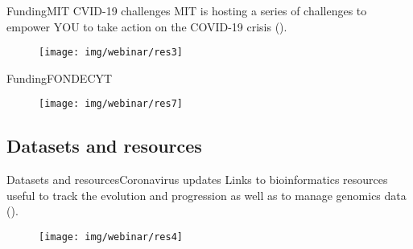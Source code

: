 \documentclass[10pt]{beamer}
\newcommand{\1}{
        	\setbeamertemplate{background}{
        		\texttt{[image: img/1]}
        		\tikz[overlay] \fill[fill opacity=0.75,fill=white] (0,0) rectangle (-\paperwidth,\paperheight);
        	}
}
\begin{document}
\begin{frame}{Funding}{MIT CVID-19 challenges }
	MIT is hosting a series of challenges to empower YOU to take action on the COVID-19 crisis (\href{https://covid19challenge.mit.edu/}{}).
	\begin{figure}[]
		\centering
		\texttt{[image: img/webinar/res3]}				
	\end{figure}	
\end{frame}

\begin{frame}{Funding}{FONDECYT}	
	\begin{figure}[]
		\centering
		\texttt{[image: img/webinar/res7]}				
	\end{figure}	
\end{frame}

\subsection{Datasets and resources}

\begin{frame}{Datasets and resources}{Coronavirus updates}
	Links to bioinformatics resources useful to track the evolution and progression as well as to manage genomics data (\href{http://www.clinbioinfosspa.es/CovidResources}{}).
	\begin{figure}[]
		\centering
		\texttt{[image: img/webinar/res4]}				
	\end{figure}	
\end{frame}
\end{document}
